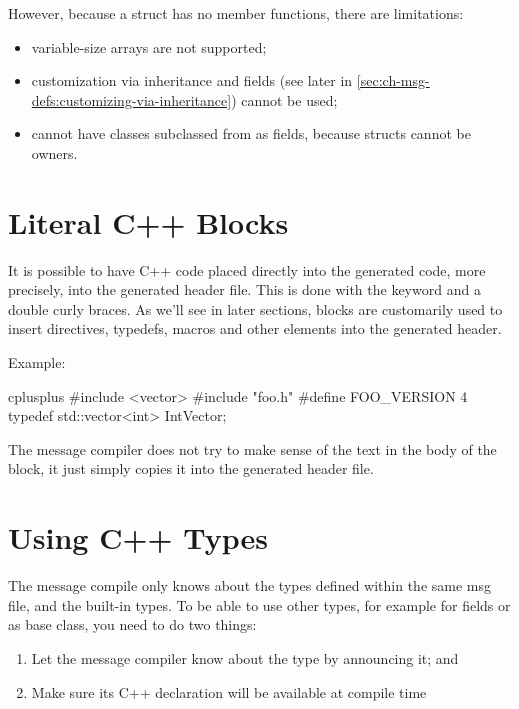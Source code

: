 However, because a struct has no member functions, there are limitations:

\begin{itemize}
   \item variable-size arrays are not supported;
   \item customization via inheritance and  fields
      (see later in \ref{sec:ch-msg-defs:customizing-via-inheritance})
      cannot be used;
   \item cannot have classes subclassed from  as fields,
      because structs cannot be owners.
\end{itemize}



\section{Literal C++ Blocks}
\label{sec:ch-msg-defs:cplusplus-blocks}

It is possible to have C++ code placed directly into the generated code,
more precisely, into the generated header file. This is done with the
 keyword and a double curly braces. As we'll see in
later sections,  blocks are customarily used to insert
 directives, typedefs,  macros and other
elements into the generated header.

Example:

\begin{msg}
cplusplus {{
#include <vector>
#include "foo.h"
#define FOO_VERSION 4
typedef std::vector<int> IntVector;
}}
\end{msg}

The message compiler does not try to make sense of the text in the body of
the  block, it just simply copies it into the generated
header file.


\section{Using C++ Types}
\label{sec:ch-msg-defs:using-cpp-types}

The message compile only knows about the types defined within the same msg
file, and the built-in types. To be able to use other types, for example
for fields or as base class, you need to do two things:

\begin{enumerate}
   \item Let the message compiler know about the type by announcing it; and
   \item Make sure its C++ declaration will be available at compile time
\end{enumerate}


